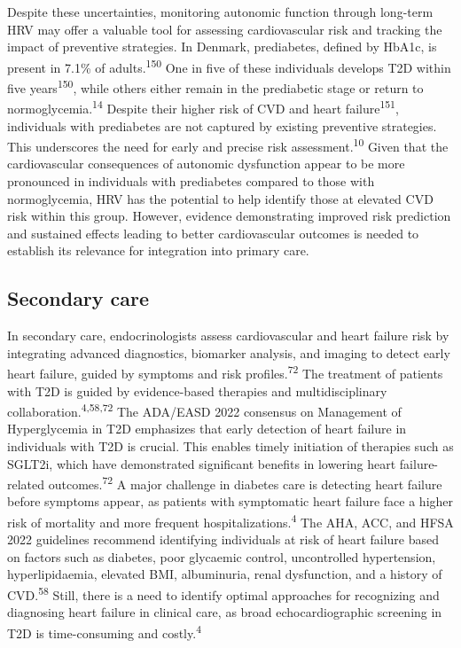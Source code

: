 \documentclass[
  a4paper,
  headsepline=true,
  open=left]{scrbook}
\begin{document}
Despite these uncertainties, monitoring autonomic function through
long-term HRV may offer a valuable tool for assessing cardiovascular
risk and tracking the impact of preventive strategies. In Denmark,
prediabetes, defined by HbA1c, is present in 7.1\% of
adults.\textsuperscript{150} One in five of these individuals develops
T2D within five years\textsuperscript{150}, while others either remain
in the prediabetic stage or return to normoglycemia.\textsuperscript{14}
Despite their higher risk of CVD and heart failure\textsuperscript{151},
individuals with prediabetes are not captured by existing preventive
strategies. This underscores the need for early and precise risk
assessment.\textsuperscript{10} Given that the cardiovascular
consequences of autonomic dysfunction appear to be more pronounced in
individuals with prediabetes compared to those with normoglycemia, HRV
has the potential to help identify those at elevated CVD risk within
this group. However, evidence demonstrating improved risk prediction and
sustained effects leading to better cardiovascular outcomes is needed to
establish its relevance for integration into primary care.

\hypertarget{secondary-care}{%
\subsection{Secondary care}\label{secondary-care}}

In secondary care, endocrinologists assess cardiovascular and heart
failure risk by integrating advanced diagnostics, biomarker analysis,
and imaging to detect early heart failure, guided by symptoms and risk
profiles.\textsuperscript{72} The treatment of patients with T2D is
guided by evidence-based therapies and multidisciplinary
collaboration.\textsuperscript{4,58,72} The ADA/EASD 2022 consensus on
Management of Hyperglycemia in T2D emphasizes that early detection of
heart failure in individuals with T2D is crucial. This enables timely
initiation of therapies such as SGLT2i, which have demonstrated
significant benefits in lowering heart failure-related
outcomes.\textsuperscript{72} A major challenge in diabetes care is
detecting heart failure before symptoms appear, as patients with
symptomatic heart failure face a higher risk of mortality and more
frequent hospitalizations.\textsuperscript{4} The AHA, ACC, and HFSA
2022 guidelines recommend identifying individuals at risk of heart
failure based on factors such as diabetes, poor glycaemic control,
uncontrolled hypertension, hyperlipidaemia, elevated BMI, albuminuria,
renal dysfunction, and a history of CVD.\textsuperscript{58} Still,
there is a need to identify optimal approaches for recognizing and
diagnosing heart failure in clinical care, as broad echocardiographic
screening in T2D is time-consuming and costly.\textsuperscript{4}
\end{document}
